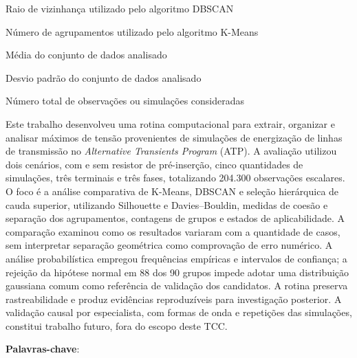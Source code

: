 \documentclass[
	12pt,				%
	openright,			%
	oneside,			%
	a4paper,			%
	chapter=TITLE,		%
	section=TITLE,		%
	subsection=TITLE,	%
	subsubsection=TITLE,%
	english,			%
	brazilian			%
	]{abntex2}
\theoremstyle{definition}
\begin{document}
\begin{simbolos}
  \item[$\varepsilon$] Raio de vizinhança utilizado pelo algoritmo DBSCAN
  \item[$k$] Número de agrupamentos utilizado pelo algoritmo K-Means
  \item[$\mu$] Média do conjunto de dados analisado
  \item[$\sigma$] Desvio padrão do conjunto de dados analisado
  \item[$N$] Número total de observações ou simulações consideradas
\end{simbolos}

\setlength{\absparsep}{18pt} %
\begin{resumo}

Este trabalho desenvolveu uma rotina computacional para extrair, organizar e analisar máximos de tensão provenientes de simulações de energização de linhas de transmissão no \textit{Alternative Transients Program} (ATP). A avaliação utilizou dois cenários, com e sem resistor de pré-inserção, cinco quantidades de simulações, três terminais e três fases, totalizando 204.300 observações escalares. O foco é a análise comparativa de K-Means, DBSCAN e seleção hierárquica de cauda superior, utilizando Silhouette e Davies--Bouldin, medidas de coesão e separação dos agrupamentos, contagens de grupos e estados de aplicabilidade. A comparação examinou como os resultados variaram com a quantidade de casos, sem interpretar separação geométrica como comprovação de erro numérico. A análise probabilística empregou frequências empíricas e intervalos de confiança; a rejeição da hipótese normal em 88 dos 90 grupos impede adotar uma distribuição gaussiana comum como referência de validação dos candidatos. A rotina preserva rastreabilidade e produz evidências reproduzíveis para investigação posterior. A validação causal por especialista, com formas de onda e repetições das simulações, constitui trabalho futuro, fora do escopo deste TCC.


 \textbf{Palavras-chave}: \imprimirpalavraschave
\end{resumo}


\end{document}

